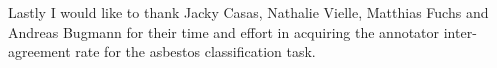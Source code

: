 \documentclass[11pt,a4paper,twoside,hidelinks,openright]{rvsmaster}
\makeatletter
\def\cleardoublepage{\clearpage\if@twoside \ifodd\c@page\else
	\hbox{}
	\thispagestyle{empty}
	\newpage
\fi\fi}
\makeatother
\begin{document}
Lastly I would like to thank Jacky Casas, Nathalie Vielle, Matthias Fuchs and Andreas Bugmann for their time and effort in acquiring the annotator inter-agreement rate for the asbestos classification task.

\cleardoublepage
\setcounter{page}{1}	%













\end{document}
